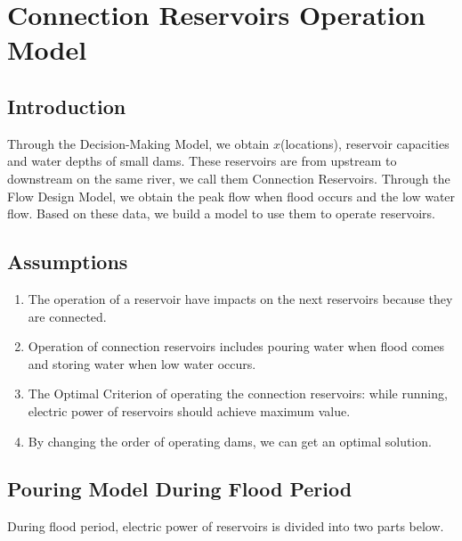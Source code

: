 \documentclass[12pt]{article}%
\begin{document}
\section{Connection Reservoirs Operation Model}
\subsection{Introduction}
Through the Decision-Making Model, we obtain $x$(locations), reservoir capacities and water depths of small dams. These reservoirs are from upstream to downstream on the same river, we call them Connection Reservoirs. Through the Flow Design Model, we obtain the peak flow when flood occurs and the low water flow. Based on these data, we build a model to use them to operate reservoirs.
\subsection{Assumptions}
\begin{enumerate}[1.]
	\item The operation of a reservoir have impacts on the next reservoirs because they are connected.
	\item Operation of connection reservoirs includes pouring water when flood comes and storing water when low water occurs.
	\item The Optimal Criterion of operating the connection reservoirs: while running, electric power of reservoirs should achieve maximum value.
	\item By changing the order of operating dams, we can get an optimal solution.
\end{enumerate}

\subsection{Pouring Model During Flood Period}
During flood period, electric power of reservoirs is divided into two parts below.
\end{document}
